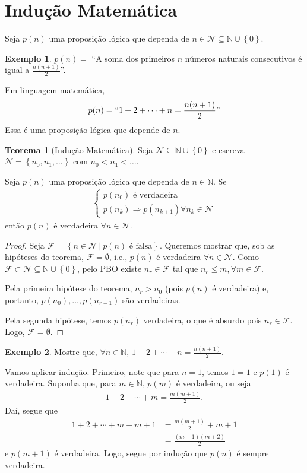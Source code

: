 \documentclass[a4paper,11pt,twoside, leqno]{article}
\theoremstyle{definition}
\newtheorem{theorem}{Teorema}[section]
\newtheorem*{example}{Exemplo}
\begin{document}
\section{Indução Matemática}
\hspace{12pt} Seja $p(n)$ uma proposição lógica que dependa de $n\in\mathcal{N}\subseteq\mathbb{N}\cup\left\{0\right\}$.
\begin{example}
	$p(n) = $ ``A soma dos primeiros $n$ números naturais consecutivos é igual a $\displaystyle{\frac{n(n+1)}{2}}$''.
	
	Em linguagem matemática, 
	\begin{align*}
	p(n) = ``1 + 2 + \cdots + n = \frac{n(n+1)}{2}"
	\end{align*}
	Essa é uma proposição lógica que depende de $n$.
\end{example}
\begin{theorem}[Indução Matemática]
	Seja $\mathcal{N}\subseteq\mathbb{N}\cup\left\{0\right\}$ e escreva $\mathcal{N} = \left\{n_0, n_1, \dots \right\}$ com $n_0 < n_1 < \dots$.
	
	Seja $p(n)$ uma proposição lógica que dependa de $n\in\mathbb{N}$. Se
	\begin{align*}
	\begin{cases}
	p(n_0) \text{ é verdadeira} \\
	p(n_k) \Longrightarrow p(n_{k+1}) \forall n_k\in\mathcal{N}
	\end{cases}
	\end{align*}
	então $p(n)$ é verdadeira $\forall n\in\mathcal{N}$.
\end{theorem}
\begin{proof}
	Seja $\mathcal{F} = \left\{ n\in\mathcal{N} \ | \ p(n) \text{ é falsa} \right\}$. Queremos mostrar que, sob as hipóteses do teorema, $\mathcal{F} = \emptyset$, i.e., $p(n)$ é verdadeira $\forall n\in\mathcal{N}$. Como $\mathcal{F}\subset\mathcal{N}\subseteq\mathbb{N}\cup\left\{0\right\}$, pelo PBO existe $n_r\in\mathcal{F}$ tal que $n_r\leq m, \forall m\in\mathcal{F}$. 
	
	Pela primeira hipótese do teorema, $n_r > n_0$ (pois $p(n)$ é verdadeira) e, portanto, $p(n_0), \dots, p(n_{r-1})$ são verdadeiras.
	
	Pela segunda hipótese, temos $p(n_r)$ verdadeira, o que é absurdo pois $n_r\in\mathcal{F}$. Logo, $\mathcal{F} = \emptyset.$ 
\end{proof}
\begin{example}
	Mostre que, $\forall n\in\mathbb{N}$, $1 + 2 + \cdots + n = \displaystyle{\frac{n(n+1)}{2}}$. 
	
	Vamos aplicar indução. Primeiro, note que para $n=1$, temos $1 = 1$ e $p(1)$ é verdadeira. Suponha que, para $m\in\mathbb{N}$, $p(m)$ é verdadeira, ou seja
	\begin{align*}
	1 + 2 + \cdots + m = \frac{m(m+1)}{2}.
	\end{align*}
	Daí, segue que
	\begin{align*}
	1 + 2 + \cdots + m + m+1 &= \frac{m(m+1)}{2} + m+1 \\
	&= \frac{(m+1)(m+2)}{2}
	\end{align*}
	e $p(m+1)$ é verdadeira. Logo, segue por indução que $p(n)$ é sempre verdadeira.
\end{example}
\end{document}
